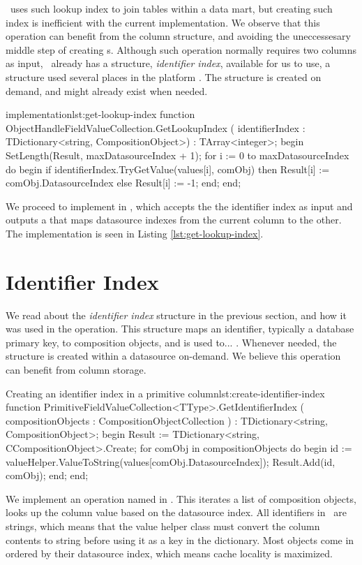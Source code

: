 \gd~uses such lookup index to join tables within a data mart, but creating such index is inefficient with the current implementation. We observe that this operation can benefit from the column structure, and avoiding the uneccessesary middle step of creating s. Although such operation normally requires two columns as input, \gap~already has a structure, \textit{identifier index}, available for us to use, a structure used several places in the platform . The structure is created on demand, and might already exist when needed.

\begin{delphicode}{ implementation}{lst:get-lookup-index}
function ObjectHandleFieldValueCollection.GetLookupIndex
( identifierIndex : TDictionary<string, CompositionObject>)
: TArray<integer>;
begin
  SetLength(Result, maxDatasourceIndex + 1);
  for i := 0 to maxDatasourceIndex do
  begin
    if identifierIndex.TryGetValue(values[i], comObj) then
      Result[i] := comObj.DatasourceIndex
    else
      Result[i] := -1;
  end;
end;
\end{delphicode}
We proceed to implement  in , which accepts the the identifier index as input and outputs a  that maps datasource indexes from the current column to the other. The implementation is seen in Listing \ref{lst:get-lookup-index}.  

\section{Identifier Index}
\label{sec:Identifier Index}
We read about the \textit{identifier index} structure in the previous section, and how it was used in the  operation. This structure maps an identifier, typically a database primary key, to composition objects, and is used to... . Whenever needed, the structure is created within a datasource on-demand. We believe this operation can benefit from column storage.

\begin{delphicode}{Creating an identifier index in a primitive column}{lst:create-identifier-index}
function PrimitiveFieldValueCollection<TType>.GetIdentifierIndex
( compositionObjects : CompositionObjectCollection )
: TDictionary<string, CompositionObject>;
begin
  Result := TDictionary<string, CCompositionObject>.Create;
  for comObj in compositionObjects do
  begin
    id := valueHelper.ValueToString(values[comObj.DatasourceIndex]);
    Result.Add(id, comObj);
  end;
end;
\end{delphicode}
We implement an operation named  in . This iterates a list of composition objects, looks up the column value based on the datasource index. All identifiers in \gap~are strings, which means that the value helper class must convert the column contents to string before using it as a key in the dictionary. Most objects come in ordered by their datasource index, which means cache locality is maximized.

